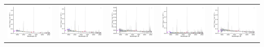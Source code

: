 \begin{center}
\begin{longtable}{l l l l l }
    \includegraphics[width=0.2\linewidth, clip]{Figs/Figs-sdss/spec-1024-52826-0028-STRIPE82-0109-049060.pdf} & \includegraphics[width=0.2\linewidth, clip]{Figs/Figs-sdss/spec-1033-52822-0623-STRIPE82-0134-016856.pdf} & \includegraphics[width=0.2\linewidth, clip]{Figs/Figs-sdss/spec-1035-52816-0289-SPLUS-s02s08-035461.pdf} & \includegraphics[width=0.2\linewidth, clip]{Figs/Figs-sdss/spec-1068-52614-0292-STRIPE82-0061-011616.pdf} & \includegraphics[width=0.2\linewidth, clip]{Figs/Figs-sdss/spec-1068-52614-0500-STRIPE82-0064-029944.pdf} \\

\end{longtable}
\end{center}
